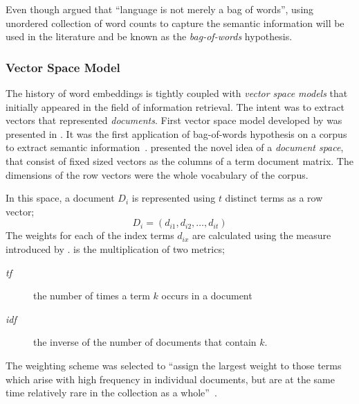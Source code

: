 Even though \citeauthor{harris_distributional_1954} argued that \enquote{language is not merely a bag of words}, using unordered collection of word counts to capture the semantic information will be used in the literature and be known as the \emph{bag-of-words} hypothesis.

\subsubsection{Vector Space Model}%
\label{ssub:vector_space_model}

The history of word embeddings is tightly coupled with \emph{vector space models} that initially appeared in the field of information retrieval.
The intent was to extract vectors that represented \emph{documents}.
First vector space model developed by \textcite{salton_vector_1975} was presented in .
It was the first application of bag-of-words hypothesis on a corpus to extract semantic information~\cite{turney_frequency_2010}.
\citeauthor{salton_vector_1975} presented the novel idea of a \emph{document space}, that consist of fixed sized vectors as the columns of a term document matrix.
The dimensions of the row vectors were the whole vocabulary of the corpus.

In this space, a document $D_i$ is represented using $t$ distinct terms as a row vector;
\begin{displaymath}
    D_{i} = (d_{i1}, d_{i2}, \ldots, d_{it})
\end{displaymath}
The weights for each of the index terms $d_{ix}$ are calculated using the \tfidf{} measure introduced by \textcite{jones_statistical_1972}.
\tfidf{} is the multiplication of two metrics;
\begin{description}
    \item[\emph{tf}] the number of times a term $k$ occurs in a document
    \item[\emph{idf}] the inverse of the number of documents that contain $k$.
\end{description}

The weighting scheme was selected to \enquote{assign the largest weight to those terms which arise with high frequency in individual documents, but are at the same time relatively rare in the collection as a whole}~\cite{salton_vector_1975}.

